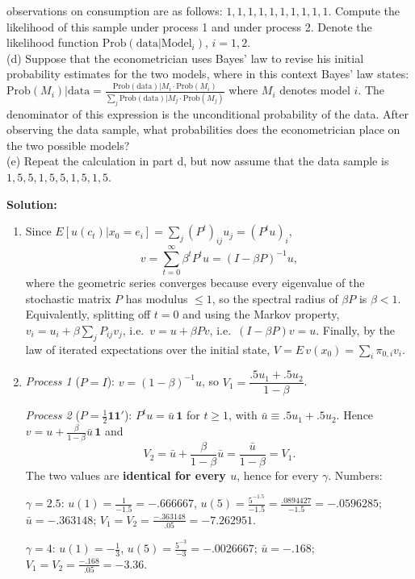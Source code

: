 \documentclass[12pt, letterpaper]{article}
\begin{document}
\begin{tcolorbox}[oddbox,title={Exercise 2.3 \quad Discounted Utility and Bayesian Model Choice}]
\begin{tcolorbox}[questionbox]
observations on consumption are as follows: $1,1,1,1,1,1,1,1,1,1$. Compute the likelihood of this
sample under process 1 and under process 2. Denote the likelihood function
$\text{Prob}(\text{data}|\text{Model}_i)$, $i=1,2$.\\
(d) Suppose that the econometrician uses Bayes' law to revise his initial probability estimates
for the two models, where in this context Bayes' law states:
$\text{Prob}(M_i)|\text{data}=\frac{\text{Prob}(\text{data})|M_i\cdot\text{Prob}(M_i)}
{\sum_j\text{Prob}(\text{data})|M_j\cdot\text{Prob}(M_j)}$ where $M_i$ denotes model $i$. The
denominator of this expression is the unconditional probability of the data. After observing the
data sample, what probabilities does the econometrician place on the two possible models?\\
(e) Repeat the calculation in part d, but now assume that the data sample is
$1,5,5,1,5,5,1,5,1,5$.
\end{tcolorbox}

\textbf{Solution:}

\begin{enumerate}
\item Since $E[u(c_t)|x_0=e_i]=\sum_j(P^t)_{ij}u_j=(P^tu)_i$,
\[
v=\sum_{t=0}^\infty\beta^tP^tu=(I-\beta P)^{-1}u,
\]
where the geometric series converges because every eigenvalue of the stochastic matrix $P$ has
modulus $\le1$, so the spectral radius of $\beta P$ is $\beta<1$. Equivalently, splitting off
$t=0$ and using the Markov property,
$v_i=u_i+\beta\sum_jP_{ij}v_j$, i.e.\ $v=u+\beta Pv$, i.e.\ $(I-\beta P)v=u$. Finally, by the law of
iterated expectations over the initial state,
$V=E\,v(x_0)=\sum_i\pi_{0,i}v_i$. \checkmark

\item \emph{Process 1} ($P=I$): $v=(1-\beta)^{-1}u$, so $V_1=\dfrac{.5u_1+.5u_2}{1-\beta}$.

\emph{Process 2} ($P=\tfrac12\mathbf 1\mathbf 1'$): $P^tu=\bar u\,\mathbf 1$ for $t\ge1$, with
$\bar u\equiv .5u_1+.5u_2$. Hence $v=u+\frac{\beta}{1-\beta}\bar u\,\mathbf 1$ and
\[
V_2=\bar u+\frac{\beta}{1-\beta}\bar u=\frac{\bar u}{1-\beta}=V_1 .
\]
The two values are \textbf{identical for every $u$}, hence for every $\gamma$. Numbers:

$\gamma=2.5$: $u(1)=\frac{1}{-1.5}=-.666667$, $u(5)=\frac{5^{-1.5}}{-1.5}=\frac{.0894427}{-1.5}=-.0596285$;
$\bar u=-.363148$; $V_1=V_2=\frac{-.363148}{.05}=\boxed{-7.262951}$.

$\gamma=4$: $u(1)=-\frac13$, $u(5)=\frac{5^{-3}}{-3}=-.0026667$; $\bar u=-.168$;
$V_1=V_2=\frac{-.168}{.05}=\boxed{-3.36}$.


\end{enumerate}
\end{tcolorbox}
\end{document}
